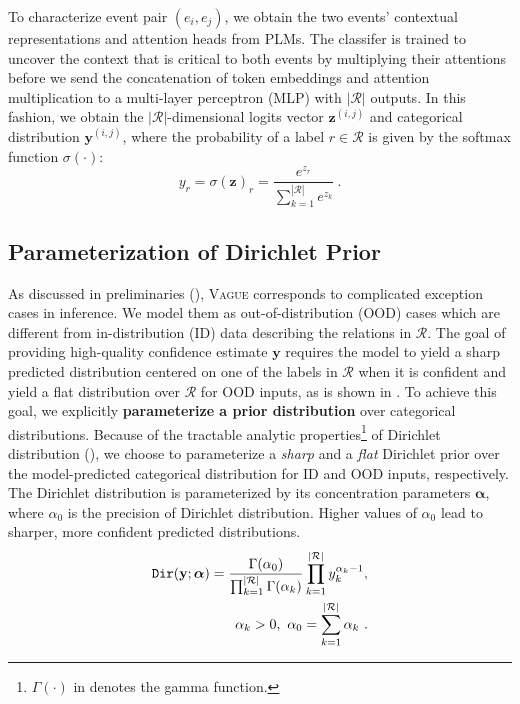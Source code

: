 \documentclass[11pt]{article}
\newcommand{\zb}{\mathbf{z}}
\newcommand{\yb}{\mathbf{y}}
\begin{document}
To characterize event pair $(e_i, e_j)$, we obtain the two events' contextual representations and attention heads from PLMs.
The classifer is trained to uncover the context that is critical to both events by multiplying their attentions before we send the concatenation of token embeddings and attention multiplication to a multi-layer perceptron (MLP) with $|\mathcal{R}|$ outputs.
In this fashion, we obtain the $|\mathcal{R}|$-dimensional logits vector $\zb^{(i, j)}$ and categorical distribution $\yb^{(i, j)}$, where
the probability of a label $r \in \mathcal{R}$ is given by the softmax function $\sigma(\cdot)$:
\begin{equation}\label{eqn:softmax}
    y_r = \sigma(\zb)_r = \frac{ e^{z_r}}{\sum_{k=1}^{|\mathcal{R}|} e^{z_k}} \ .
\end{equation}

\subsection{Parameterization of Dirichlet Prior}
\label{sec:uncertainty_esti}
As discussed in preliminaries (), \textsc{Vague} corresponds to complicated exception cases in inference.
We model them as out-of-distribution (OOD) cases which are different from in-distribution (ID) data describing the relations in $\mathcal{R}$. The goal of providing high-quality confidence estimate $\yb$ requires the model to yield a sharp predicted distribution centered on one of the labels in $\mathcal{R}$ when it is confident and yield a flat distribution over $\mathcal{R}$ for OOD inputs, as is shown in .
To achieve this goal, we explicitly \textbf{parameterize a prior distribution} over categorical distributions.
Because of the tractable analytic properties\footnote{$\Gamma(\cdot)$ in  denotes the gamma function.} of Dirichlet distribution (), we choose to parameterize a \emph{sharp} and a \emph{flat} Dirichlet prior over the model-predicted categorical distribution for ID and OOD inputs, respectively. 
The Dirichlet distribution is parameterized by its concentration parameters $\bm{\alpha}$, where $\alpha_0$ is the precision of Dirichlet distribution. Higher values of $\alpha_0$ lead to sharper, more confident predicted distributions. 
\begin{equation}\label{eqn:dirichlet}
\begin{aligned}
{\tt Dir}(\bm{\yb};\bm{\alpha}) = \frac{\Gamma(\alpha_0)}{\prod_{k=1}^{|\mathcal{R}|}\Gamma(\alpha_k)}\prod_{k=1}^{|\mathcal{R}|} y_k^{\alpha_k -1} , \\
\alpha_k >0 ,\ \alpha_0 = \sum_{k=1}^{|\mathcal{R}|} \alpha_k \ .
\end{aligned}
\end{equation} 
\end{document}
